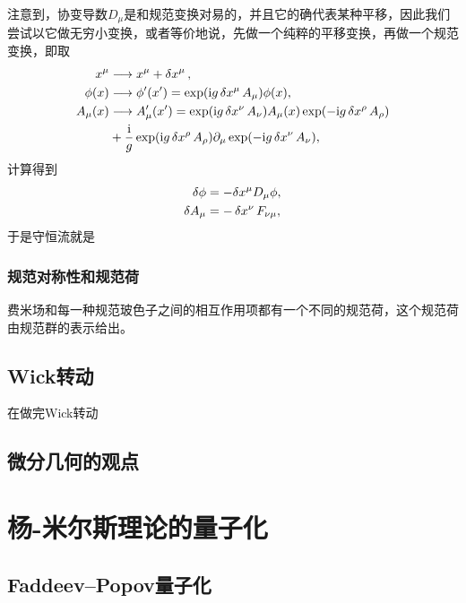 \documentclass[hyperref, UTF8, a4paper]{ctexart}
\newcommand*{\ii}{\mathrm{i}}
\begin{document}
注意到，协变导数$D_\mu$是和规范变换对易的，并且它的确代表某种平移，因此我们尝试以它做无穷小变换，或者等价地说，先做一个纯粹的平移变换，再做一个规范变换，即取
\begin{equation}
    \begin{aligned}
        x^\mu &\longrightarrow x^\mu + \var{x^\mu}, \\
        \phi(x) &\longrightarrow \phi'(x') = \exp(\ii g \var{x^\mu} A_\mu) \phi(x), \\
        A_\mu(x) &\longrightarrow A_{\mu}'(x') = \exp(\ii g \var{x^\nu} A_\nu) A_\mu(x) \exp(- \ii g \var{x^\rho} A_\rho) \\
        &+ \frac{\ii}{g} \exp(\ii g \var{x^\rho} A_\rho) \partial_\mu \exp(- \ii g \var{x^\nu} A_\nu),
    \end{aligned}
\end{equation}
计算得到
\begin{equation}
    \begin{aligned}
        \var{\phi} &= - \var x^\mu D_\mu \phi, \\
        \var{A_\mu} &= - \var{x^\nu} F_{\nu \mu},
    \end{aligned} 
\end{equation}
于是守恒流就是

\subsubsection{规范对称性和规范荷}

费米场和每一种规范玻色子之间的相互作用项都有一个不同的规范荷，这个规范荷由规范群的表示给出。

\subsection{Wick转动}

在做完Wick转动

\subsection{微分几何的观点}

\section{杨-米尔斯理论的量子化}

\subsection{Faddeev–Popov量子化}
\end{document}

